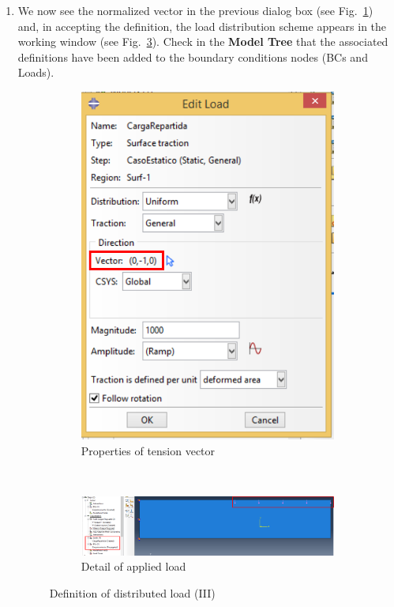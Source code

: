 \begin{enumerate}
\item We now see the normalized vector in the previous dialog box (see
  Fig.~\ref{figu49}) and, in accepting the definition, the load
  distribution scheme appears in the working window (see
  Fig.~\ref{figu50}). Check in the \textbf{Model Tree} that the
  associated definitions have been added to the boundary conditions nodes (BCs and Loads).
  \begin{figure}[H]
    \centering
    \begin{subfigure}{0.30\textwidth}
      \includegraphics[width=\textwidth]{./body/images/imagen49.pdf}
      \caption{Properties of tension vector}
      \label{figu49}
    \end{subfigure}%
    ~ %
    \begin{subfigure}{0.67\textwidth}
      \includegraphics[width=\textwidth]{./body/images/imagen50.pdf}
      \caption{Detail of applied load}
      \label{figu50}
    \end{subfigure}%
    \caption{Definition of distributed load (III)}
  \end{figure}
\end{enumerate}

